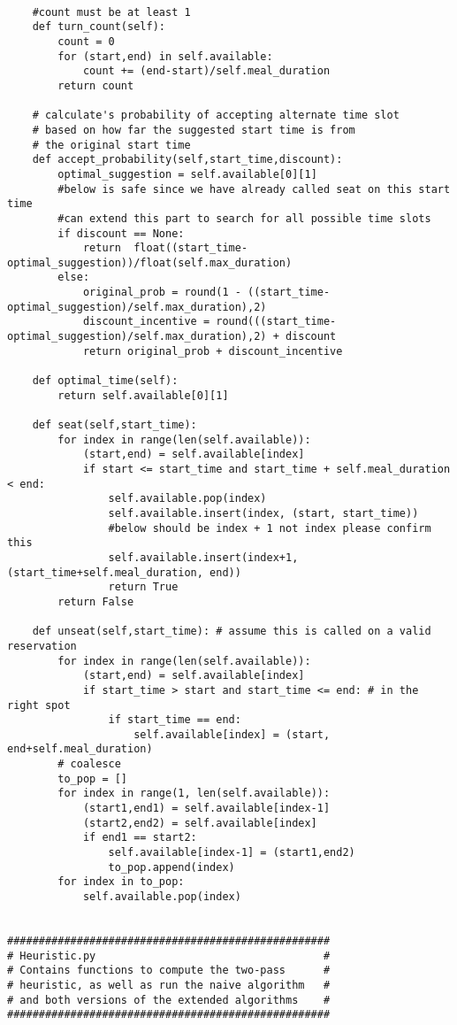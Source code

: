 \documentclass[12pt, titlepage]{article}
\begin{document}
\begin{Verbatim}[fontsize=\scriptsize]
    
    #count must be at least 1
    def turn_count(self):
        count = 0
        for (start,end) in self.available:
            count += (end-start)/self.meal_duration
        return count
    
    # calculate's probability of accepting alternate time slot
    # based on how far the suggested start time is from
    # the original start time
    def accept_probability(self,start_time,discount):
        optimal_suggestion = self.available[0][1]
        #below is safe since we have already called seat on this start time
        #can extend this part to search for all possible time slots
        if discount == None:
            return  float((start_time-optimal_suggestion))/float(self.max_duration)
        else:
            original_prob = round(1 - ((start_time-optimal_suggestion)/self.max_duration),2)
            discount_incentive = round(((start_time-optimal_suggestion)/self.max_duration),2) + discount
            return original_prob + discount_incentive
    
    def optimal_time(self):
        return self.available[0][1]

    def seat(self,start_time):
        for index in range(len(self.available)):
            (start,end) = self.available[index]
            if start <= start_time and start_time + self.meal_duration < end:
                self.available.pop(index)
                self.available.insert(index, (start, start_time))
                #below should be index + 1 not index please confirm this
                self.available.insert(index+1, (start_time+self.meal_duration, end))
                return True
        return False

    def unseat(self,start_time): # assume this is called on a valid reservation
        for index in range(len(self.available)):
            (start,end) = self.available[index]
            if start_time > start and start_time <= end: # in the right spot
                if start_time == end:
                    self.available[index] = (start, end+self.meal_duration)
        # coalesce
        to_pop = []
        for index in range(1, len(self.available)):
            (start1,end1) = self.available[index-1]
            (start2,end2) = self.available[index]
            if end1 == start2:
                self.available[index-1] = (start1,end2)
                to_pop.append(index)
        for index in to_pop:
            self.available.pop(index)
                

###################################################
# Heuristic.py                                    #
# Contains functions to compute the two-pass      #
# heuristic, as well as run the naive algorithm   #
# and both versions of the extended algorithms    #
###################################################



\end{Verbatim}
\end{document}
